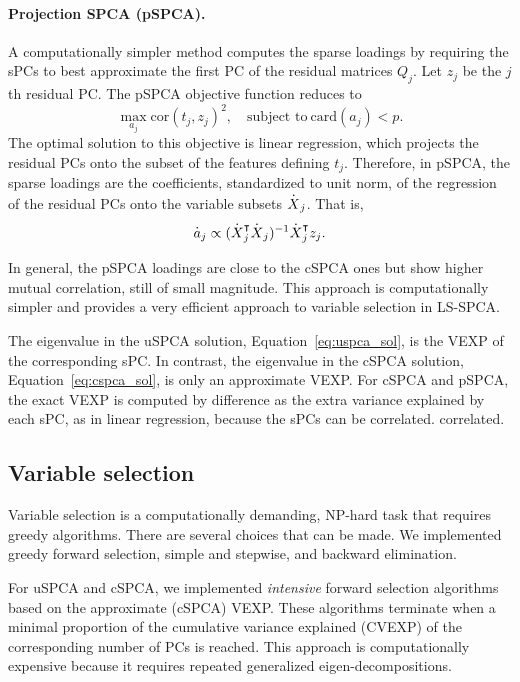 \documentclass[article]{jss}
\begin{document}
\paragraph{Projection SPCA (pSPCA).}
A computationally simpler method computes the sparse loadings by requiring the sPCs to best approximate the first PC of the residual matrices $Q_j$. Let $z_j$ be the $j$th residual PC. The pSPCA objective function reduces to
\begin{equation}\label{eq:pscpca_obj}
\max_{a_j} \text{cor}(t_j, z_j)^2,
\quad \text{subject to}\:\text{card}(a_j) < p.
\end{equation}
The optimal solution to this objective is linear regression, which projects the residual PCs onto the subset of the features defining $t_j$. Therefore, in pSPCA, the sparse loadings are the coefficients, standardized to unit norm, of the regression of the residual PCs onto the variable subsets ${\overset{\boldsymbol{.}}{X}_j}$. That is,
\begin{equation}
\daj \propto (\dXjT\dXj)^{-1} \dXjT z_j.
\end{equation}
 
In general, the pSPCA loadings are close to the cSPCA ones but show higher mutual correlation, still of small magnitude. This approach is computationally simpler and provides a very efficient approach to variable selection in LS-SPCA.

The eigenvalue in the uSPCA solution, Equation~\ref{eq:uspca_sol}, is the VEXP of the corresponding sPC. In contrast, the eigenvalue in the cSPCA solution, Equation~\ref{eq:cspca_sol}, is only an approximate VEXP. For cSPCA and pSPCA, the exact VEXP is computed by difference as the extra variance explained by each sPC, as in linear regression, because the sPCs can be correlated.
correlated. 
\subsection{Variable selection}
Variable selection is a computationally demanding, NP-hard task that requires greedy algorithms. There are several choices that can be made. We implemented greedy forward selection, simple and stepwise, and backward elimination. 

For uSPCA and cSPCA, we implemented \emph{intensive} forward selection algorithms based on the approximate (cSPCA) VEXP. These algorithms terminate when a minimal proportion of the cumulative variance explained (CVEXP) of the corresponding number of PCs is reached. This approach is computationally expensive because it requires repeated generalized eigen-decompositions.
\end{document}
